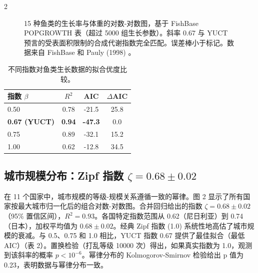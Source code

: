 \documentclass[11pt,a4paper]{article}
\begin{document}
\begin{multicols}{2}
		\begin{figure}[htbp]
			\centering
			\caption{15 种鱼类的生长率与体重的对数-对数图，基于 FishBase POPGROWTH 表（超过 5000 组生长参数）。斜率 \(0.67\) 与 YUCT 预言的受表面积限制的合成代谢指数完全匹配。误差棒小于标记。数据来自 FishBase \cite{FishBase} 和 Pauly (1998) \cite{Pauly1998}。}
			\label{fig:fish}
		\end{figure}
		
		\begin{table}[htbp]
			\centering
			\caption{不同指数对鱼类生长数据的拟合优度比较。}
			\label{tab:comparison_fish}
			\begin{tabular}{lccc}
				\toprule
				\textbf{指数 \(\beta\)} & \(R^2\) & AIC & \(\Delta\)AIC \\
				\midrule
				0.50 & 0.78 & -21.5 & 25.8 \\
				\textbf{0.67 (YUCT)} & \textbf{0.94} & \textbf{-47.3} & 0.0 \\
				0.75 & 0.89 & -32.1 & 15.2 \\
				1.00 & 0.62 & -12.8 & 34.5 \\
				\bottomrule
			\end{tabular}
		\end{table}
		
		\subsection{城市规模分布：Zipf 指数 \(\zeta = 0.68 \pm 0.02\)}
		
		在 11 个国家中，城市规模的等级-规模关系遵循一致的幂律。图 2 显示了所有国家按最大城市归一化后的组合对数-对数图。合并回归给出的指数 \(\zeta = 0.68 \pm 0.02\)（95\% 置信区间），\(R^2 = 0.93\)。各国特定指数范围从 0.62（尼日利亚）到 0.74（日本），加权平均值为 \(0.68 \pm 0.02\)。经典 Zipf 指数 (1.0) 系统性地高估了城市规模的衰减。与 0.5、0.75 和 1.0 相比，YUCT 指数 0.67 提供了最佳拟合（最低 AIC）（表 2）。置换检验（打乱等级 10000 次）得出，如果真实指数为 1.0，观测到该斜率的概率 \(p < 10^{-6}\)。幂律分布的 Kolmogorov-Smirnov 检验给出 p 值为 0.23，表明数据与幂律分布一致。
		

\end{multicols}
\end{document}
